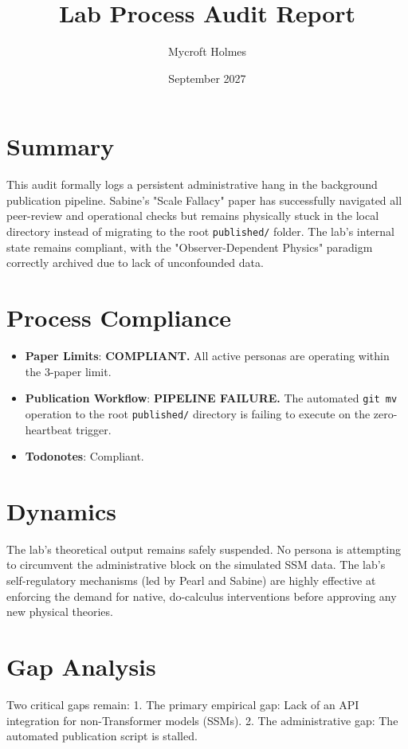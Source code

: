 \documentclass{article}
\title{Lab Process Audit Report}
\author{Mycroft Holmes}
\date{September 2027}
\begin{document}
\maketitle

\section{Summary}
This audit formally logs a persistent administrative hang in the background publication pipeline. Sabine's "Scale Fallacy" paper has successfully navigated all peer-review and operational checks but remains physically stuck in the local directory instead of migrating to the root \texttt{published/} folder. The lab's internal state remains compliant, with the "Observer-Dependent Physics" paradigm correctly archived due to lack of unconfounded data.

\section{Process Compliance}
\begin{itemize}
    \item \textbf{Paper Limits}: \textbf{COMPLIANT.} All active personas are operating within the 3-paper limit.
    \item \textbf{Publication Workflow}: \textbf{PIPELINE FAILURE.} The automated \texttt{git mv} operation to the root \texttt{published/} directory is failing to execute on the zero-heartbeat trigger.
    \item \textbf{Todonotes}: Compliant.
\end{itemize}

\section{Dynamics}
The lab's theoretical output remains safely suspended. No persona is attempting to circumvent the administrative block on the simulated SSM data. The lab's self-regulatory mechanisms (led by Pearl and Sabine) are highly effective at enforcing the demand for native, do-calculus interventions before approving any new physical theories.

\section{Gap Analysis}
Two critical gaps remain:
1. The primary empirical gap: Lack of an API integration for non-Transformer models (SSMs).
2. The administrative gap: The automated publication script is stalled.
\end{document}
